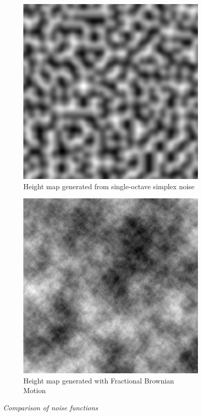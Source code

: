 \begin{figure}[H]
\begin{subfigure}{.5\textwidth}
  \centering
  \includegraphics[width=0.9\linewidth]{images/Simplex.jpg}
  \caption{Height map generated from single-octave simplex noise}
  \label{fig:sub1}
\end{subfigure}%
\begin{subfigure}{.5\textwidth}
  \centering
  \includegraphics[width=0.9\linewidth]{images/FracBrownMotion.jpg}
  \caption{Height map generated with Fractional Brownian Motion}
  \label{fig:sub2}
\end{subfigure}
\caption[Noise comparison]{\textit{Comparison of noise functions}}
\label{fig:R_kitchen_example}
\end{figure}

